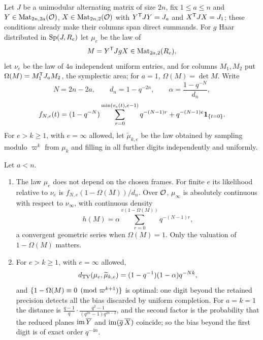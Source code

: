 Let $J$ be a unimodular alternating matrix of size $2n$, fix $1\le a\le n$ and
$Y\in\operatorname{Mat}_{2n,2a}(\mathcal{O})$, $X\in\operatorname{Mat}_{2n,2}(\mathcal{O})$ with $Y^{\mathsf{T}}JY=J_a$ and
$X^{\mathsf{T}}JX=J_1$; these conditions already make their columns span direct summands. For $g$
Haar distributed in $\operatorname{Sp}(J,R_e)$ let $\mu_e$ be the law of
\[
 M=Y^{\mathsf{T}}JgX\in\operatorname{Mat}_{2a,2}(R_e),
\]
let $\nu_e$ be the law of $4a$ independent uniform entries, and for columns $M_1,M_2$ put
$\Omega(M)=M_1^{\mathsf{T}}J_aM_2$, the symplectic area; for $a=1$, $\Omega(M)=\det M$. Write
\[
 N=2n-2a,\qquad d_n=1-q^{-2n},\qquad \alpha=\frac{1-q^{-N}}{d_n},
\]
\[
 f_{N,e}(t)=(1-q^{-N})\sum_{r=0}^{\min(v_e(t),e-1)}q^{-(N-1)r}+q^{-(N-1)e}\mathbf 1_{\{t=0\}} .
\]
For $e>k\ge1$, with $e=\infty$ allowed, let $\widetilde\mu_{k,e}$ be the law obtained by sampling
modulo $\varpi^k$ from $\mu_k$ and filling in all further digits independently and uniformly.

\begin{theorem}\label{spn:thm:padic}
Let $a<n$.
\begin{enumerate}
\item The law $\mu_e$ does not depend on the chosen frames. For finite $e$ its likelihood
relative to $\nu_e$ is $f_{N,e}(1-\Omega(M))/d_n$. Over $\mathcal{O}$, $\mu_\infty$ is absolutely
continuous with respect to $\nu_\infty$, with continuous density
\[
 h(M)=\alpha\sum_{r=0}^{v(1-\Omega(M))}q^{-(N-1)r},
\]
a convergent geometric series when $\Omega(M)=1$. Only the valuation of $1-\Omega(M)$ matters.
\item For $e>k\ge1$, with $e=\infty$ allowed,
\[
 d_{\mathrm{TV}}(\mu_e,\widetilde\mu_{k,e})=(1-q^{-1})(1-\alpha)q^{-Nk},
\]
and $\{1-\Omega(M)\equiv0\pmod{\varpi^{k+1}}\}$ is optimal: one digit beyond the retained
precision detects all the bias discarded by uniform completion. For $a=k=1$ the distance is
$\frac{q-1}q\cdot\frac{q^2-1}{(q^{2n}-1)q^{2n-2}}$, and the second factor is the probability that
the reduced planes $\operatorname{im}\overline Y$ and $\operatorname{im}(\overline g\,\overline X)$ coincide; so the
bias beyond the first digit is of exact order $q^{-4n}$.
\end{enumerate}
\end{theorem}


